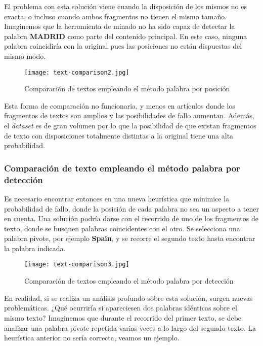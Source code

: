 El problema con esta solución viene cuando la disposición de los mismos no es exacta, o incluso cuando 
ambos fragmentos no tienen el mismo tamaño. Imaginemos que la herramienta de minado no ha sido capaz de 
detectar la palabra \textbf{MADRID} como parte del contenido principal. En este caso, ninguna palabra 
coincidiría con la original pues las posiciones no están dispuestas del mismo modo.

\begin{figure}[tphb]
  \centering
  \texttt{[image: text-comparison2.jpg]}
  \caption{Comparación de textos empleando el método palabra por posición}
  \label{img:comparacion de textos empleando el metodo palabra por posicion p2}
\end{figure}

Esta forma de comparación no funcionaria, y menos en artículos donde los fragmentos de textos son amplios
y las posibilidades de fallo aumentan. Además, el \emph{dataset} es de gran volumen por lo que la posibilidad 
de que existan fragmentos de texto con disposiciones totalmente distintas a la original tiene una alta 
probabilidad.

\subsubsection{Comparación de texto empleando el método palabra por detección}
\label{subsubsec:comparacion de textos empleando el metodo palabra por deteccion}

Es necesario encontrar entonces en una nueva heurística que minimice la probabilidad de fallo, donde la 
posición de cada palabra no sea un aspecto a tener en cuenta. Una solución podría darse con el recorrido 
de uno de los fragmentos de texto, donde se busquen palabras coincidentes con el otro. Se selecciona una 
palabra pivote, por ejemplo \textbf{Spain}, y se recorre el segundo texto hasta encontrar la palabra 
indicada.

\begin{figure}[tphb]
  \centering
  \texttt{[image: text-comparison3.jpg]}
  \caption{Comparación de textos empleando el método palabra por detección}
  \label{img:comparacion de textos empleando el metodo palabra por deteccion}
\end{figure}

En realidad, si se realiza un análisis profundo sobre esta solución, surgen nuevas problemáticas. ¿Qué
ocurriría si apareciesen dos palabras idénticas sobre el mismo texto? Imaginemos que durante el recorrido
del primer texto, se debe analizar una palabra pivote repetida varias veces a lo largo del segundo texto. 
La heurística anterior no sería correcta, veamos un ejemplo.

